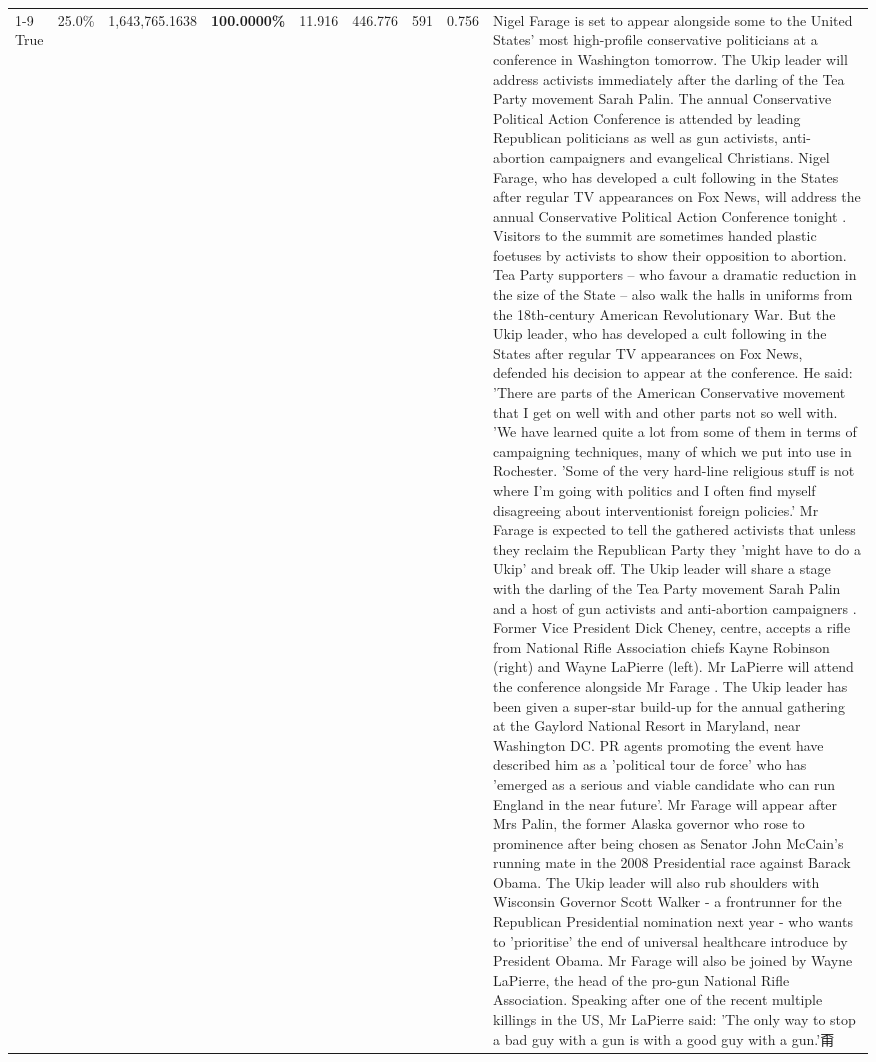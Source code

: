 \begin{table}[H]
\begin{tabular}{lllrlllll}
\cline{1-9}
True & 25.0\% & 1,643,765.1638 & \bfseries \color{red} 100.0000\% & 11.916 & 446.776 & 591 & 0.756 & Nigel Farage is set to appear alongside some to the United States' most high-profile conservative politicians at a conference in Washington tomorrow. The Ukip leader will address activists immediately after the darling of the Tea Party movement Sarah Palin. The annual Conservative Political Action Conference is attended by leading Republican politicians as well as gun activists, anti-abortion campaigners and evangelical Christians. Nigel Farage, who has developed a cult following in the States after regular TV appearances on Fox News, will address the annual Conservative Political Action Conference tonight . Visitors to the summit are sometimes handed plastic foetuses by activists to show their opposition to abortion. Tea Party supporters – who favour a dramatic reduction in the size of the State – also walk the halls in uniforms from the 18th-century American Revolutionary War. But the Ukip leader, who has developed a cult following in the States after regular TV appearances on Fox News, defended his decision to appear at the conference. He said: 'There are parts of the American Conservative movement that I get on well with and other parts not so well with. 'We have learned quite a lot from some of them in terms of campaigning techniques, many of which we put into use in Rochester. 'Some of the very hard-line religious stuff is not where I'm going with politics and I often find myself disagreeing about interventionist foreign policies.' Mr Farage is expected to tell the gathered activists that unless they reclaim the Republican Party they 'might have to do a Ukip' and break off. The Ukip leader will share a stage with the darling of the Tea Party movement Sarah Palin and a host of gun activists and anti-abortion campaigners . Former Vice President Dick Cheney, centre, accepts a rifle from National Rifle Association chiefs Kayne Robinson (right) and Wayne LaPierre (left). Mr LaPierre will attend the conference alongside Mr Farage . The Ukip leader has been given a super-star build-up for the annual gathering at the Gaylord National Resort in Maryland, near Washington DC. PR agents promoting the event have described him as a 'political tour de force' who has 'emerged as a serious and viable candidate who can run England in the near future'. Mr Farage will appear after Mrs Palin, the former Alaska governor who rose to prominence after being chosen as Senator John McCain's running mate in the 2008 Presidential race against Barack Obama. The Ukip leader will also rub shoulders with Wisconsin Governor Scott Walker - a frontrunner for the Republican Presidential nomination next year - who wants to 'prioritise' the end of universal healthcare introduce by President Obama. Mr Farage will also be joined by Wayne LaPierre, the head of the pro-gun National Rifle Association. Speaking after one of the recent multiple killings in the US, Mr LaPierre said: 'The only way to stop a bad guy with a gun is with a good guy with a gun.'甭 \\

\end{tabular}
\end{table}
